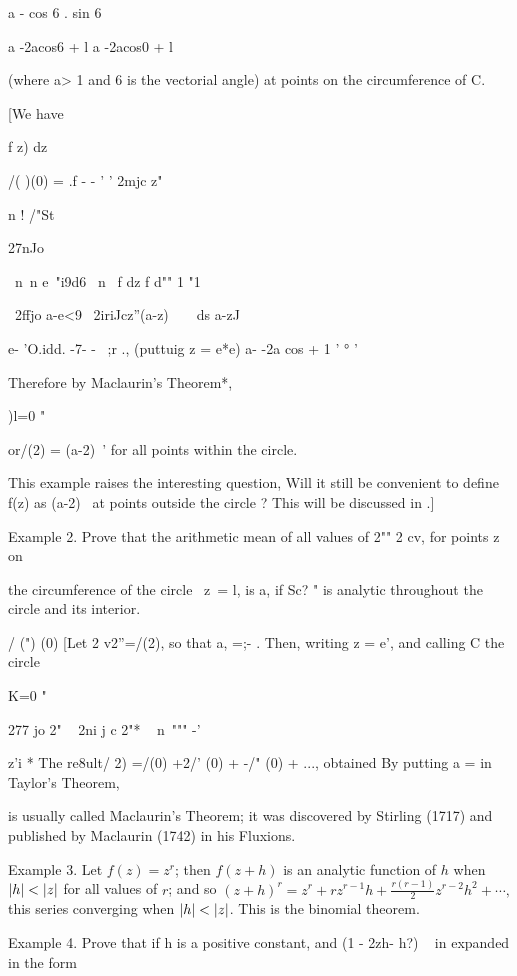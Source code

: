 {{a - cos 6 . sin 6

a -2acos6 + l a -2acos0 + l

(where a> 1 and 6 is the vectorial angle) at points on the
circumference of C.

[We have

f z) dz

/( )(0) = .f - - ' ' 2mjc z"

n ! /"St

27nJo

\ n\ n e~"i9d6 \ n \ f dz f d"" 1 "1

~2ffjo a-e<9 ~2iriJcz''(a-z)~~\ \ ds a-zJ

e- 'O.idd. -7- - ~;r ., (puttuig z = e*e) a- -2a cos + 1 ' ° '

Therefore by Maclaurin's Theorem*,

)l=0 "

or/(2) = (a-2)~' for all points within the circle.

This example raises the interesting question, Will it still be
convenient to define f(z) as (a-2)~ at points outside the circle ?
This will be discussed in .]

Example 2. Prove that the arithmetic mean of all values of 2"" 2 cv,
for points z on

the circumference of the circle \ z\ = l, is a, if Sc? " is analytic
throughout the circle and its interior.

/ (") (0) [Let 2 v2''=/(2), so that a, =;- . Then, writing z = e',
and calling C the circle

K=0 "

277 jo 2" ~ 2ni j c 2"* ~ n\ """ -'

z'i * The re8ult/ 2) =/(0) +2/' (0) + -/" (0) + ..., obtained By
putting a = in Taylor's Theorem,

is usually called Maclaurin's Theorem; it was discovered by Stirling
(1717) and published by Maclaurin (1742) in his Fluxions.

%
%

Example 3. Let $f(z) = z^{r}$; then $f(z+h)$ is an analytic function
of $h$ when $\left| h \right| < \left| z \right|$ for all values of $r$; and so
$(z + h)^{r} = z^{r} + rz^{r-1} h + \frac{ r (r-1) }{2} z^{r-2} h^{2}
+ \cdots, $ this series converging when $\left| h \right| < \left| z \right|$.
This is the binomial theorem.

Example 4. Prove that if h is a positive constant, and (1 - 2zh- h?) ~
in expanded in the form

}}
